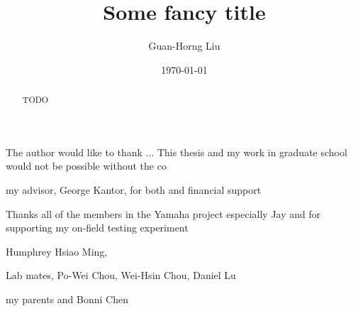 \documentclass[hidelinks, 12pt]{cmuthesis}
\begin{document}
 
\frontmatter

\pagestyle{empty}

\title{ %
{\bf Some fancy title}}
\author{Guan-Horng Liu}
\date{\today}
\trnumber{}


\support{}
\disclaimer{}



\maketitle



\pagestyle{plain} %


\begin{abstract}
  TODO
\end{abstract}

\begin{acknowledgments}

The author would like to thank ...
This thesis and my work in graduate school would not be possible without the co

my advisor, George Kantor, for both and financial support

Thanks all of the members in the Yamaha project 
especially Jay and 
for supporting my on-field testing experiment


Humphrey
Hsiao Ming, 

Lab mates, Po-Wei Chou, Wei-Hsin Chou, Daniel Lu

my parents and Bonni Chen

\end{acknowledgments}



\tableofcontents
\listoffigures
\listoftables
\end{document}
